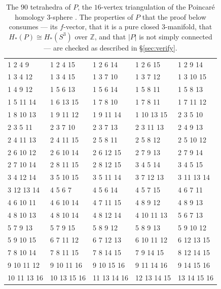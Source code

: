\documentclass[11pt]{amsart}
\theoremstyle{definition}
\theoremstyle{remark}
\begin{document}
\begin{table}[htbp]
\small
\setlength{\tabcolsep}{9pt}
\begin{tabular}{lllll}
\hline
1 2 4 9 & 1 2 4 15 & 1 2 6 14 & 1 2 6 15 & 1 2 9 14 \\
1 3 4 12 & 1 3 4 15 & 1 3 7 10 & 1 3 7 12 & 1 3 10 15 \\
1 4 9 12 & 1 5 6 13 & 1 5 6 14 & 1 5 8 11 & 1 5 8 13 \\
1 5 11 14 & 1 6 13 15 & 1 7 8 10 & 1 7 8 11 & 1 7 11 12 \\
1 8 10 13 & 1 9 11 12 & 1 9 11 14 & 1 10 13 15 & 2 3 5 10 \\
2 3 5 11 & 2 3 7 10 & 2 3 7 13 & 2 3 11 13 & 2 4 9 13 \\
2 4 11 13 & 2 4 11 15 & 2 5 8 11 & 2 5 8 12 & 2 5 10 12 \\
2 6 10 12 & 2 6 10 14 & 2 6 12 15 & 2 7 9 13 & 2 7 9 14 \\
2 7 10 14 & 2 8 11 15 & 2 8 12 15 & 3 4 5 14 & 3 4 5 15 \\
3 4 12 14 & 3 5 10 15 & 3 5 11 14 & 3 7 12 13 & 3 11 13 14 \\
3 12 13 14 & 4 5 6 7 & 4 5 6 14 & 4 5 7 15 & 4 6 7 11 \\
4 6 10 11 & 4 6 10 14 & 4 7 11 15 & 4 8 9 12 & 4 8 9 13 \\
4 8 10 13 & 4 8 10 14 & 4 8 12 14 & 4 10 11 13 & 5 6 7 13 \\
5 7 9 13 & 5 7 9 15 & 5 8 9 12 & 5 8 9 13 & 5 9 10 12 \\
5 9 10 15 & 6 7 11 12 & 6 7 12 13 & 6 10 11 12 & 6 12 13 15 \\
7 8 10 14 & 7 8 11 15 & 7 8 14 15 & 7 9 14 15 & 8 12 14 15 \\
9 10 11 12 & 9 10 11 16 & 9 10 15 16 & 9 11 14 16 & 9 14 15 16 \\
10 11 13 16 & 10 13 15 16 & 11 13 14 16 & 12 13 14 15 & 13 14 15 16 \\
\hline
\end{tabular}
\medskip
\caption{The $90$ tetrahedra of $P$, the $16$-vertex triangulation of the Poincar\'e
homology $3$-sphere \cite{BL}. The properties of $P$ that the proof below consumes ---
its $f$-vector, that it is a pure closed $3$-manifold, that $H_*(P)\cong H_*(S^3)$ over
$\mathbb Z$, and that $|P|$ is not simply connected --- are checked as described in
\S\ref{sec:verify}.}
\label{tab:P}
\end{table}
\end{document}
